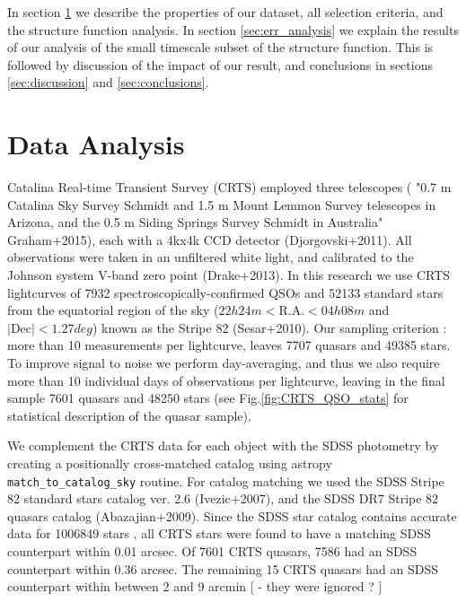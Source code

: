 \documentclass[fleqn,usenatbib]{mnras}  %
\begin{document}
In section \ref{sec:obs} we describe the properties of our dataset, all selection criteria, and the structure function analysis.  In section \ref{sec:err_analysis} we explain the results of our analysis of the small timescale subset of the structure function. This is followed by discussion of the impact of our result, and conclusions in sections \ref{sec:discussion} and \ref{sec:conclusions}.
 

\section{Data Analysis}
\label{sec:obs}

Catalina Real-time Transient Survey (CRTS) employed three telescopes ( "0.7 m Catalina Sky Survey Schmidt and 1.5 m Mount Lemmon Survey telescopes in Arizona, and the 0.5 m Siding Springs Survey Schmidt in Australia" Graham+2015), each with a  4kx4k CCD detector (Djorgovski+2011). All observations were taken in an unfiltered white light, and calibrated to the Johnson system V-band zero point (Drake+2013). In this research we use CRTS lightcurves of 7932 spectroscopically-confirmed QSOs and 52133 standard stars  from the equatorial region of the sky ($22h 24m < \mathrm{R.A.} < 04h 08m$ and $\mathrm{| Dec |} < 1.27 deg$)  known as the Stripe 82 (Sesar+2010). Our sampling criterion : more than 10 measurements per lightcurve, leaves 7707 quasars and 49385 stars.  To improve signal to noise we perform day-averaging, and thus we  also require more than 10 individual days of observations per lightcurve, leaving in the final sample 7601 quasars and 48250 stars (see Fig.\ref{fig:CRTS_QSO_stats} for statistical description of the quasar sample). 

We complement the CRTS data for each object  with the SDSS photometry by creating a positionally cross-matched catalog using astropy  \verb|match_to_catalog_sky| routine. For catalog matching we used the SDSS Stripe 82 standard stars catalog  ver. 2.6  (Ivezic+2007), and   the SDSS DR7  Stripe 82 quasars catalog (Abazajian+2009).   Since the SDSS star catalog contains accurate data for 1006849 stars , all CRTS stars were found to have a matching SDSS counterpart within 0.01 arcsec.  Of 7601  CRTS quasars,  7586 had an SDSS counterpart within 0.36 arcsec.  The remaining 15 CRTS quasars had an SDSS counterpart within between  2 and 9 arcmin  [ - they were ignored ?  ]   
\end{document}
